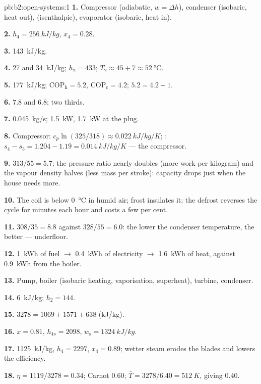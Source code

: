 \begin{solution}{pb:b2:open-systems:1}
\textbf{1.} Compressor (adiabatic, $w = \Delta h$), condenser (isobaric, heat
out),  (isenthalpic), evaporator (isobaric, heat in).

\textbf{2.} $h_4 = \qty{256}{kJ/kg}$, $x_4 = 0.28$.

\textbf{3.} \qty{143}{kJ/kg}.

\textbf{4.} \qty{27}{} and \qty{34}{kJ/kg}; $h_2 = 433$; $T_2 \approx 45 + 7 \approx
\qty{52}{\celsius}$.

\textbf{5.} \qty{177}{kJ/kg}; $\mathrm{COP}_{\text{h}} = 5.2$, $\mathrm{COP}_{\text{c}} = 4.2$;
$5.2 = 4.2 + 1$.

\textbf{6.} $7.8$ and $6.8$; two thirds.

\textbf{7.} \qty{0.045}{kg/s}; \qty{1.5}{kW}, \qty{1.7}{kW} at the plug.

\textbf{8.} Compressor: $c_p\ln(325/318) \approx \qty{0.022}{kJ/kg/K}$;
: $s_4 - s_3 = 1.204 - 1.19 = \qty{0.014}{kJ/kg/K}$ --- the compressor.

\textbf{9.} $313/55 = 5.7$; the pressure ratio nearly doubles (more work
per kilogram) and the vapour density halves (less mass per stroke):
capacity drops just when the house needs more.

\textbf{10.} The coil is below \qty{0}{\celsius} in humid air; frost
insulates it; the defrost reverses the cycle for minutes each hour and
costs a few per cent.

\textbf{11.} $308/35 = 8.8$ against $328/55 = 6.0$: the lower the
condenser temperature, the better --- underfloor.

\textbf{12.} \qty{1}{kWh} of fuel $\to$ \qty{0.4}{kWh} of electricity $\to$
\qty{1.6}{kWh} of heat, against \qty{0.9}{kWh} from the boiler.

\textbf{13.} Pump, boiler (isobaric heating, vaporisation, superheat),
turbine, condenser.

\textbf{14.} \qty{6}{kJ/kg}; $h_2 = 144$.

\textbf{15.} $3278 = 1069 + 1571 + 638$ (\unit{kJ/kg}).

\textbf{16.} $x = 0.81$, $h_{4s} = 2098$, $w_{\text{s}} = \qty{1324}{kJ/kg}$.

\textbf{17.} \qty{1125}{kJ/kg}, $h_4 = 2297$, $x_4 = 0.89$; wetter steam erodes the
blades and lowers the efficiency.

\textbf{18.} $\eta = 1119/3278 = 0.34$; Carnot $0.60$; $\bar T = 3278/6.40 =
\qty{512}{K}$, giving $0.40$.


\end{solution}
